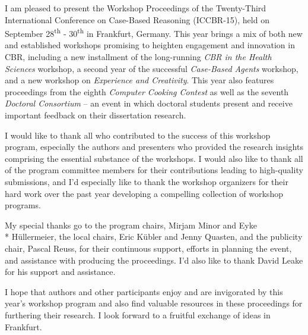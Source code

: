 I am pleased to present the Workshop Proceedings of the Twenty-Third International Conference on Case-Based Reasoning (ICCBR-15), held on September 28\textsuperscript{th} - 30\textsuperscript{th} in Frankfurt, Germany. This year brings a mix of both new and established workshops promising to heighten engagement and innovation in CBR, including a new installment of the long-running \textit{CBR in the Health Sciences} workshop, a second year of the successful \textit{Case-Based Agents} workshop, and a new workshop on \textit{Experience and Creativity}. This year also features proceedings from the eighth \textit{Computer Cooking Contest} as well as the seventh \textit{Doctoral Consortium} -- an event in which doctoral students present and receive important feedback on their dissertation research. 

I would like to thank all who contributed to the success of this workshop program, especially the authors and presenters who provided the research insights comprising the essential substance of the workshops. I would also like to thank all of the program committee members for their contributions leading to high-quality submissions, and I'd especially like to thank the workshop organizers for their hard work over the past year developing a compelling collection of workshop programs. 

My special thanks go to the program chairs, Mirjam Minor and 
Eyke \\* H\"ullermeier, the local chairs, Eric K\"ubler and Jenny Quasten, and the publicity chair, Pascal Reuss, for their continuous support, efforts in planning the event, and assistance with producing the proceedings. I'd also like to thank David Leake for his support and assistance. 

I hope that authors and other participants enjoy and are invigorated by this year's workshop program and also find valuable resources in these proceedings for furthering their research. I look forward to a fruitful exchange of ideas in Frankfurt.

